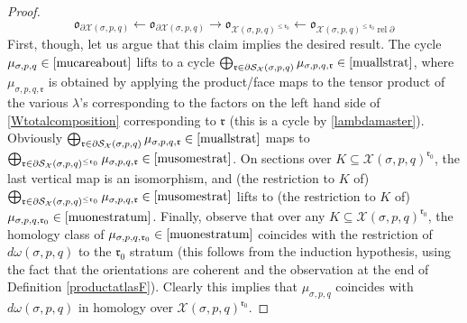 \documentclass[12pt]{article}
\theoremstyle{definition}
\theoremstyle{remark}
\numberwithin{equation}{subsection}
\newcommand{\rr}{\mathfrak r}
\newcommand{\oo}{\mathfrak o}
\newcommand{\X}{\mathcal X}
\newcommand{\SSS}{\mathcal S}
\newcommand{\rel}{\operatorname{rel}}
\begin{document}
\begin{proof}
\begin{equation}\label{orientationdiagramforHFbdry}
\oo_{\partial\X(\sigma,p,q)}\leftarrow\oo_{\partial\X(\sigma,p,q)}\to\oo_{\X(\sigma,p,q)^{\leq\rr_0}}\leftarrow\oo_{\X(\sigma,p,q)^{\leq\rr_0}\rel\partial}
\end{equation}
First, though, let us argue that this claim implies the desired result.  The cycle $\mu_{\sigma,p,q}\in\eqref{mucareabout}$ lifts to a cycle $\bigoplus_{\rr\in\partial\SSS_\X(\sigma,p,q)}\mu_{\sigma,p,q,\rr}\in\eqref{muallstrat}$, where $\mu_{\sigma,p,q,\rr}$ is obtained by applying the product/face maps to the tensor product of the various $\lambda$'s corresponding to the factors on the left hand side of \eqref{Wtotalcomposition} corresponding to $\rr$ (this is a cycle by \eqref{lambdamaster}).  Obviously $\bigoplus_{\rr\in\partial\SSS_\X(\sigma,p,q)}\mu_{\sigma,p,q,\rr}\in\eqref{muallstrat}$ maps to $\bigoplus_{\rr\in\partial\SSS_\X(\sigma,p,q)^{\leq\rr_0}}\mu_{\sigma,p,q,\rr}\in\eqref{musomestrat}$.  On sections over $K\subseteq\X(\sigma,p,q)^{\rr_0}$, the last vertical map is an isomorphism, and (the restriction to $K$ of) $\bigoplus_{\rr\in\partial\SSS_\X(\sigma,p,q)^{\leq\rr_0}}\mu_{\sigma,p,q,\rr}\in\eqref{musomestrat}$ lifts to (the restriction to $K$ of) $\mu_{\sigma,p,q,\rr_0}\in\eqref{muonestratum}$.  Finally, observe that over any $K\subseteq\X(\sigma,p,q)^{\rr_0}$, the homology class of $\mu_{\sigma,p,q,\rr_0}\in\eqref{muonestratum}$ coincides with the restriction of $d\omega(\sigma,p,q)$ to the $\rr_0$ stratum (this follows from the induction hypothesis, using the fact that the orientations are coherent and the observation at the end of Definition \ref{productatlasF}).  Clearly this implies that $\mu_{\sigma,p,q}$ coincides with $d\omega(\sigma,p,q)$ in homology over $\X(\sigma,p,q)^{\rr_0}$.


\end{proof}
\end{document}
